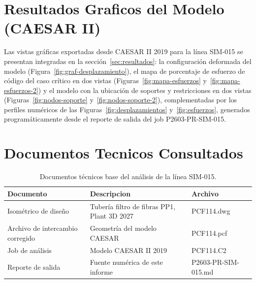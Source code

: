 \appendix
\section{Resultados Graficos del Modelo (CAESAR II)}
\label{appendix:graficos}

Las vistas gr\'{a}ficas exportadas desde CAESAR II 2019 para la l\'{i}nea
SIM-015 se presentan integradas en la secci\'{o}n~\ref{sec:resultados}: la
configuraci\'{o}n deformada del modelo (Figura~\ref{fig:graf-desplazamiento}),
el mapa de porcentaje de esfuerzo de c\'{o}digo del caso cr\'{i}tico en dos
vistas (Figuras~\ref{fig:mapa-esfuerzos} y~\ref{fig:mapa-esfuerzos-2}) y el
modelo con la ubicaci\'{o}n de soportes y restricciones en dos vistas
(Figuras~\ref{fig:nodos-soporte} y~\ref{fig:nodos-soporte-2}), complementadas
por los perfiles num\'{e}ricos de las Figuras~\ref{fig:desplazamientos}
y~\ref{fig:esfuerzos}, generados program\'{a}ticamente desde el reporte de
salida del job P2603-PR-SIM-015.

\section{Documentos Tecnicos Consultados}
\label{appendix:documentos}

\begin{table}[htbp]
    \centering
    \small
    \caption{Documentos t\'{e}cnicos base del an\'{a}lisis de la l\'{i}nea SIM-015.}
    \label{tab:planos}
    \begin{tabular}{@{}lll@{}}
        \toprule
        \textbf{Documento} & \textbf{Descripcion} & \textbf{Archivo} \\
        \midrule
        Isom\'{e}trico de dise\~{n}o & Tuber\'{i}a filtro de fibras PP1, Plant 3D 2027 & PCF114.dwg \\
        Archivo de intercambio corregido & Geometr\'{i}a del modelo CAESAR & PCF114.pcf \\
        Job de an\'{a}lisis & Modelo CAESAR II 2019 & PCF114.C2 \\
        Reporte de salida & Fuente num\'{e}rica de este informe & P2603-PR-SIM-015.md \\
        \bottomrule
    \end{tabular}
\end{table}
